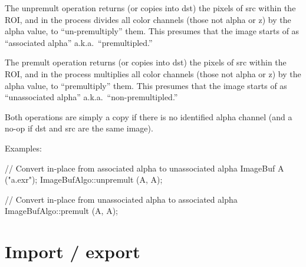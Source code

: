  

The {\cf unpremult} operation returns (or copies into dst) the pixels of src within the ROI, and in the process
divides all color channels (those not alpha or z)
by the alpha value, to ``un-premultiply'' them.  This presumes that the
image starts of as ``associated alpha'' a.k.a.\ ``premultipled.''

The {\cf premult} operation returns (or copies into dst) the pixels of src within the ROI, and in the process
multiplies all color channels (those not alpha or z)
by the alpha value, to ``premultiply'' them.  This presumes that the
image starts of as ``unassociated alpha'' a.k.a.\ ``non-premultipled.''

Both operations are simply a copy if there is no identified alpha channel
(and a no-op if {\cf dst} and {\cf src} are the same image).

\smallskip
\noindent Examples:
\begin{code}
    // Convert in-place from associated alpha to unassociated alpha
    ImageBuf A ("a.exr");
    ImageBufAlgo::unpremult (A, A);

    // Convert in-place from unassociated alpha to associated alpha
    ImageBufAlgo::premult (A, A);
\end{code}
\apiend



\section{Import / export}
\label{sec:iba:importexport}

 


